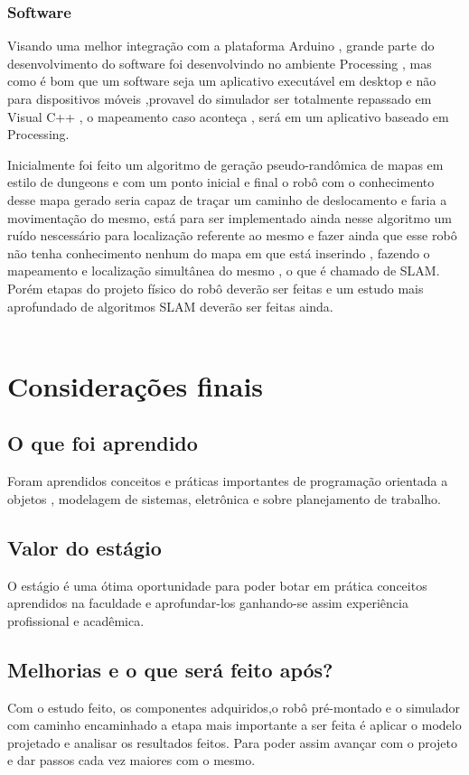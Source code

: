 \documentclass[11pt,a4paper]{article}
\begin{document}
\subsubsection{Software}

\hspace{1.5cm}Visando uma melhor integração com a plataforma Arduino , grande parte do desenvolvimento do software foi desenvolvindo no ambiente Processing , mas como é bom que um software seja um aplicativo executável em desktop e não para dispositivos móveis ,provavel do simulador ser totalmente repassado em Visual C++ , o mapeamento caso aconteça , será em um aplicativo baseado em Processing.

Inicialmente foi feito um algoritmo de geração pseudo-randômica de mapas em estilo de dungeons e com um ponto inicial e final o robô com o conhecimento  desse mapa gerado seria capaz de traçar um caminho de deslocamento e faria a movimentação do mesmo, está para ser implementado ainda nesse algoritmo um ruído nescessário para localização referente ao mesmo e fazer ainda que esse robô não tenha conhecimento nenhum do mapa em que está inserindo , fazendo o mapeamento e localização simultânea do mesmo , o que é chamado de SLAM. Porém etapas do projeto físico do robô deverão ser feitas e um estudo mais aprofundado de algoritmos SLAM deverão ser feitas ainda.\\
\\
\vfill
\newpage
\section{Considerações finais}
\subsection{O que foi aprendido}
\hspace{1.5cm}Foram aprendidos conceitos e práticas importantes de programação orientada a objetos , modelagem de sistemas, eletrônica e sobre planejamento de trabalho.
\subsection{Valor do estágio}
\hspace{1.5cm}O estágio é uma ótima oportunidade para poder botar em prática conceitos aprendidos na faculdade e aprofundar-los ganhando-se assim experiência profissional e acadêmica.
\subsection{Melhorias e o que será feito após?}
\hspace{1.5cm}Com o estudo feito, os componentes adquiridos,o robô pré-montado e o simulador com caminho encaminhado a etapa mais importante a ser feita é aplicar o modelo projetado e analisar os resultados feitos. Para poder assim avançar com o projeto e dar passos cada vez maiores com o mesmo. 
\vfill

\end{document}
